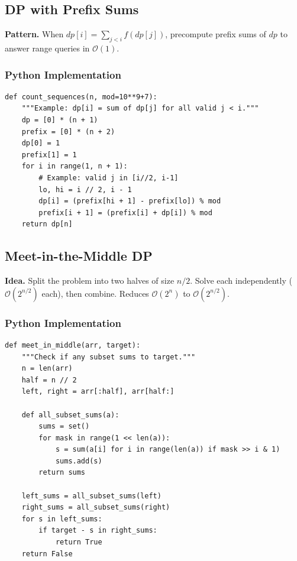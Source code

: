 \documentclass[10pt,a4paper]{article}
\theoremstyle{cpstyle}
\newcommand{\bigO}[1]{\mathcal{O}\!\left(#1\right)}
\begin{document}
\subsection{DP with Prefix Sums}

\textbf{Pattern.} When $dp[i] = \sum_{j<i} f(dp[j])$, precompute prefix sums of $dp$ to answer range queries in $\bigO{1}$.

\subsubsection{Python Implementation}
\begin{lstlisting}[caption={DP with prefix sums -- count sequences}]
def count_sequences(n, mod=10**9+7):
    """Example: dp[i] = sum of dp[j] for all valid j < i."""
    dp = [0] * (n + 1)
    prefix = [0] * (n + 2)
    dp[0] = 1
    prefix[1] = 1
    for i in range(1, n + 1):
        # Example: valid j in [i//2, i-1]
        lo, hi = i // 2, i - 1
        dp[i] = (prefix[hi + 1] - prefix[lo]) % mod
        prefix[i + 1] = (prefix[i] + dp[i]) % mod
    return dp[n]
\end{lstlisting}

\subsection{Meet-in-the-Middle DP}

\textbf{Idea.} Split the problem into two halves of size $n/2$. Solve each independently ($\bigO{2^{n/2}}$ each), then combine. Reduces $\bigO{2^n}$ to $\bigO{2^{n/2}}$.

\subsubsection{Python Implementation}
\begin{lstlisting}[caption={Meet-in-the-Middle -- subset sum}]
def meet_in_middle(arr, target):
    """Check if any subset sums to target."""
    n = len(arr)
    half = n // 2
    left, right = arr[:half], arr[half:]

    def all_subset_sums(a):
        sums = set()
        for mask in range(1 << len(a)):
            s = sum(a[i] for i in range(len(a)) if mask >> i & 1)
            sums.add(s)
        return sums

    left_sums = all_subset_sums(left)
    right_sums = all_subset_sums(right)
    for s in left_sums:
        if target - s in right_sums:
            return True
    return False
\end{lstlisting}
\end{document}
